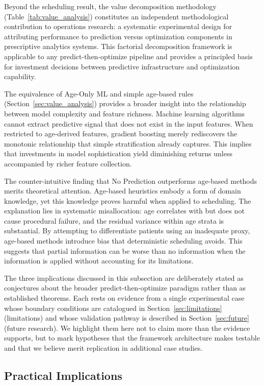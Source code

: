 \documentclass[11pt,a4paper]{article}
\begin{document}
Beyond the scheduling result, the value decomposition methodology (Table~\ref{tab:value_analysis}) constitutes an independent methodological contribution to operations research: a systematic experimental design for attributing performance to prediction versus optimization components in prescriptive analytics systems. This factorial decomposition framework is applicable to any predict-then-optimize pipeline and provides a principled basis for investment decisions between predictive infrastructure and optimization capability.

The equivalence of Age-Only ML and simple age-based rules (Section~\ref{sec:value_analysis}) provides a broader insight into the relationship between model complexity and feature richness. Machine learning algorithms cannot extract predictive signal that does not exist in the input features. When restricted to age-derived features, gradient boosting merely rediscovers the monotonic relationship that simple stratification already captures. This implies that investments in model sophistication yield diminishing returns unless accompanied by richer feature collection.

The counter-intuitive finding that No Prediction outperforms age-based methods merits theoretical attention. Age-based heuristics embody a form of domain knowledge, yet this knowledge proves harmful when applied to scheduling. The explanation lies in systematic misallocation: age correlates with but does not cause procedural failure, and the residual variance within age strata is substantial. By attempting to differentiate patients using an inadequate proxy, age-based methods introduce bias that deterministic scheduling avoids. This suggests that partial information can be worse than no information when the information is applied without accounting for its limitations.

The three implications discussed in this subsection are deliberately stated as conjectures about the broader predict-then-optimize paradigm rather than as established theorems. Each rests on evidence from a single experimental case whose boundary conditions are catalogued in Section~\ref{sec:limitations} (limitations) and whose validation pathway is described in Section~\ref{sec:future} (future research). We highlight them here not to claim more than the evidence supports, but to mark hypotheses that the framework architecture makes testable and that we believe merit replication in additional case studies.

\subsection{Practical Implications}
\end{document}
